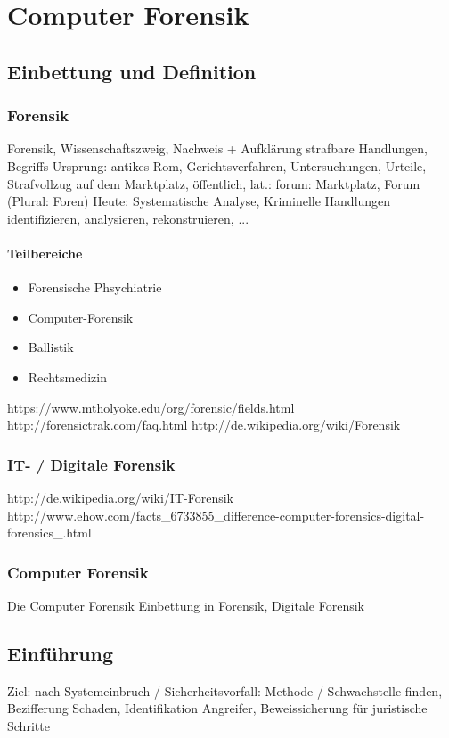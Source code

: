 \chapter{Computer Forensik}
\section{Einbettung und Definition}
\subsection{Forensik}
Forensik, Wissenschaftszweig, Nachweis + Aufklärung strafbare Handlungen,
Begriffs-Ursprung: antikes Rom, Gerichtsverfahren, Untersuchungen, Urteile, Strafvollzug auf dem Marktplatz, öffentlich, lat.: forum: Marktplatz, Forum (Plural: Foren)
Heute: Systematische Analyse, Kriminelle Handlungen identifizieren, analysieren, rekonstruieren, ...

\subsubsection{Teilbereiche}
\begin{itemize}
\item Forensische Phsychiatrie

\item Computer-Forensik
\item Ballistik
\item Rechtsmedizin
\end{itemize}

https://www.mtholyoke.edu/org/forensic/fields.html
http://forensictrak.com/faq.html
http://de.wikipedia.org/wiki/Forensik

\subsection{IT- / Digitale Forensik}
http://de.wikipedia.org/wiki/IT-Forensik
http://www.ehow.com/facts_6733855_difference-computer-forensics-digital-forensics_.html

\subsection{Computer Forensik}
Die Computer Forensik
Einbettung in Forensik, Digitale Forensik


\section{Einführung}
Ziel: nach Systemeinbruch / Sicherheitsvorfall: Methode / Schwachstelle finden, Bezifferung Schaden, Identifikation Angreifer, Beweissicherung für juristische Schritte


